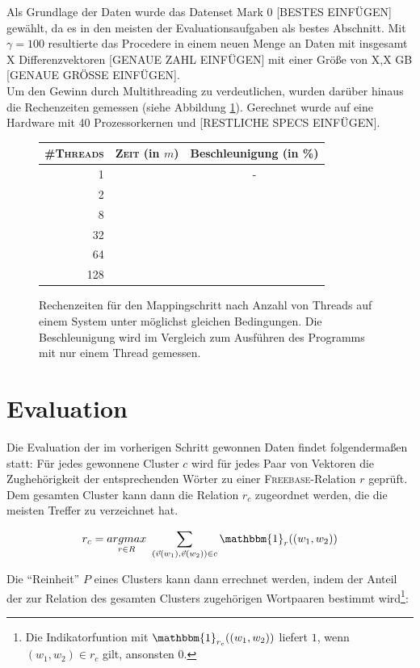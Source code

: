 Als Grundlage der Daten wurde das Datenset Mark 0 [BESTES EINFÜGEN] gewählt, da es in den meisten der Evaluationsaufgaben
als bestes Abschnitt. Mit $\gamma = 100$ resultierte das Procedere in einem neuen Menge an Daten mit insgesamt
X Differenzvektoren [GENAUE ZAHL EINFÜGEN] mit einer Größe von X,X GB [GENAUE GRÖSSE EINFÜGEN].\\
Um den Gewinn durch Multithreading zu verdeutlichen, wurden darüber hinaus die Rechenzeiten gemessen (siehe Abbildung \ref{fig:times}).
Gerechnet wurde auf eine Hardware mit 40 Prozessorkernen und [RESTLICHE SPECS EINFÜGEN].

\begin{figure}[h]
  \centering
  \begin{tabular}{r|cc}
    \textsc{\#Threads} & \textsc{Zeit} (in $m$) & Beschleunigung (in \%) \\
    \hline
    1 & & - \\
    2 & & \\
    8 & & \\
    32 & & \\
    64 & & \\
    128 & & \\
  \end{tabular}
  \caption[Rechenzeiten für den Mappingschritt nach Anzahl von Threads]{Rechenzeiten für den Mappingschritt nach Anzahl von Threads auf
  einem System unter möglichst gleichen Bedingungen. Die Beschleunigung wird im Vergleich zum Ausführen des Programms
  mit nur einem Thread gemessen.\label{fig:times}}
\end{figure}

\section{Evaluation}

Die Evaluation der im vorherigen Schritt gewonnen Daten findet folgendermaßen statt: Für jedes gewonnene Cluster $c$ wird für
jedes Paar von Vektoren die Zughehörigkeit der entsprechenden Wörter zu einer \textsc{Freebase}-Relation $r$ geprüft.
Dem gesamten Cluster kann dann die Relation $r_c$ zugeordnet werden, die die meisten Treffer zu verzeichnet hat.

\begin{equation}
    r_c = \underset{r \in R}{argmax}\ \sum_{(\vec{v}(w_1), \vec{v}(w_2)) \in c}  \mathbbm{1}_{r}((w_1, w_2))
\end{equation}

Die ``Reinheit'' $P$ eines Clusters kann dann errechnet werden, indem der Anteil der zur Relation des gesamten Clusters
zugehörigen Wortpaaren bestimmt wird\footnote{Die Indikatorfuntion mit $\mathbbm{1}_{r_c}((w_1, w_2))$ liefert $1$, wenn
$(w_1, w_2) \in r_c$ gilt, ansonsten $0$.}:

